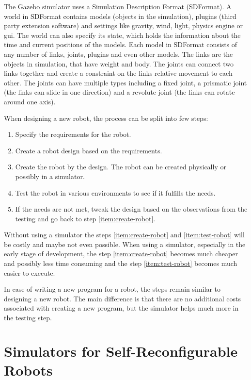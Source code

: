 \documentclass[
  digital, %
  table,   %
  oneside, %
  nolof,     %
  nolot,     %
]{fithesis3}
\begin{document}
The Gazebo simulator uses a Simulation Description Format (SDFormat)\cite{sdf}.
A world in SDFormat contains models (objects in the simulation), plugins (third party extension software) and settings like gravity, wind, light, physics engine or gui.
The world can also specify its state, which holds the information about the time and current positions of the models.
Each model in SDFormat consists of any number of links, joints, plugins and even other models.
The links are the objects in simulation, that have weight and body.
The joints can connect two links together and create a constraint on the links relative movement to each other.
The joints can have multiple types including a fixed joint, a prismatic joint (the links can slide in one direction) and a revolute joint (the links can rotate around one axis).

When designing a new robot, the process can be split into few steps:
\begin{enumerate}
    \item Specify the requirements for the robot.
    \item Create a robot design based on the requirements.
    \item Create the robot by the design.\label{item:create-robot}
    The robot can be created physically or possibly in a simulator.
    \item Test the robot in various environments to see if it fulfills the needs.\label{item:test-robot}
    \item If the needs are not met, tweak the design based on the observations from the testing and go back to step \ref{item:create-robot}.
\end{enumerate}
Without using a simulator the steps \ref{item:create-robot} and \ref{item:test-robot} will be costly and maybe not even possible.
When using a simulator, especially in the early stage of development, the step \ref{item:create-robot} becomes much cheaper and possibly less time consuming and the step \ref{item:test-robot} becomes much easier to execute.

In case of writing a new program for a robot, the steps remain similar to designing a new robot.
The main difference is that there are no additional costs associated with creating a new program, but the simulator helps much more in the testing step.

\section{Simulators for Self-Reconfigurable Robots}
\end{document}
